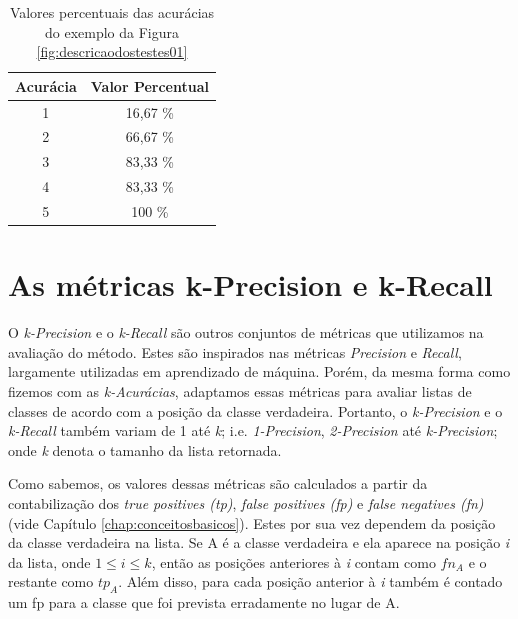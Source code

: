 \begin{table}[h!]
  \begin{center}
    \begin{tabular}{cc}
      \hline
      \textbf{Acurácia} & \textbf{Valor Percentual} \\
      \hline

      1 & 16,67 \% \\
      2 & 66,67 \% \\
      3 & 83,33 \% \\
      4 & 83,33 \% \\
      5 & 100 \% \\

      \hline
    \end{tabular}
    \caption{Valores percentuais das acurácias do exemplo da Figura \ref{fig:descricaodostestes01}}
    \label{tab:valoresacuraciasexemplo}
  \end{center}
\end{table}

\newpage   
\section{As métricas k-Precision e k-Recall}

O \textit{k-Precision} e o \textit{k-Recall} são outros conjuntos de métricas que utilizamos na avaliação do método.
Estes são inspirados nas métricas \textit{Precision} e \textit{Recall}, largamente utilizadas em aprendizado de máquina.
Porém, da mesma forma como fizemos com as \textit{k-Acurácias}, adaptamos essas métricas para avaliar listas de classes de acordo com a posição da classe verdadeira.
Portanto, o \textit{k-Precision} e o \textit{k-Recall} também variam de 1 até \textit{k}; i.e. \textit{1-Precision}, \textit{2-Precision} até \textit{k-Precision}; onde \textit{k} denota o tamanho da lista retornada.

Como sabemos, os valores dessas métricas são calculados a partir da contabilização dos \textit{true positives (tp)}, \textit{false positives (fp)} e \textit{false negatives (fn)} (vide Capítulo \ref{chap:conceitosbasicos}).
Estes por sua vez dependem da posição da classe verdadeira na lista.
Se A é a classe verdadeira e ela aparece na posição \textit{i} da lista, onde $1 \leq \textit{i} \leq \textit{k}$, então as posições anteriores à \textit{i} contam como $fn_A$ e o restante como $tp_A$.
Além disso, para cada posição anterior à \textit{i} também é contado um fp para a classe que foi prevista erradamente no lugar de A.


